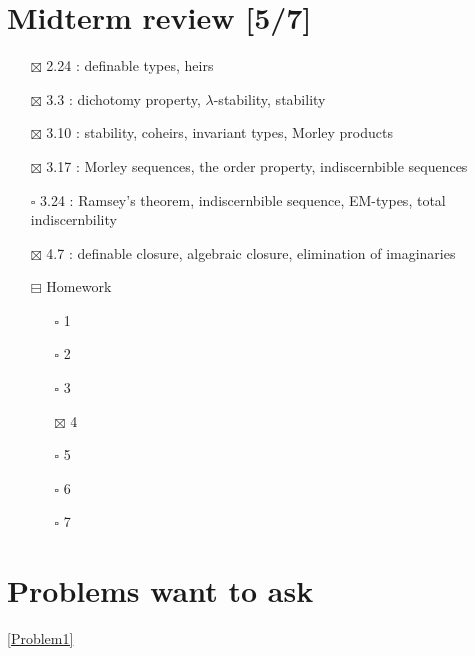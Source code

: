 \documentclass[11pt]{article}
\begin{document}
\section{Midterm review [5/7]}
\label{sec:orgb14ed72}
\begin{itemize}
\item[{$\boxtimes$}] 2.24 : definable types, heirs
\item[{$\boxtimes$}] 3.3 : dichotomy property, \(\lambda\)-stability, stability
\item[{$\boxtimes$}] 3.10 : stability, coheirs, invariant types, Morley products
\item[{$\boxtimes$}] 3.17 : Morley sequences, the order property, indiscernbible sequences
\item[{$\square$}] 3.24 : Ramsey's theorem, indiscernbible sequence, EM-types, total indiscernbility
\item[{$\boxtimes$}] 4.7 : definable closure, algebraic closure, elimination of imaginaries
\item[{$\boxminus$}] Homework
\begin{itemize}
\item[{$\square$}] 1
\item[{$\square$}] 2
\item[{$\square$}] 3
\item[{$\boxtimes$}] 4
\item[{$\square$}] 5
\item[{$\square$}] 6
\item[{$\square$}] 7
\end{itemize}
\end{itemize}

\section{Problems want to ask}
\label{sec:org1fce129}
\ref{Problem1}
\end{document}
